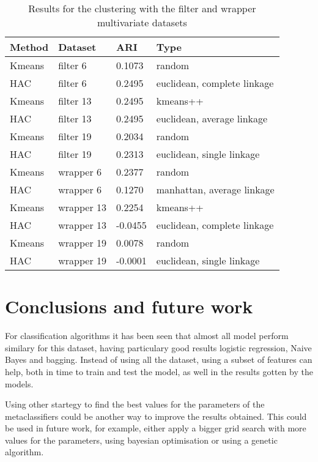 \documentclass[a4paper,11pt]{article}
\begin{document}
\begin{table}
\centering
\begin{tabular}{|l|l|l|l|}
\hline

\textbf{Method} & \textbf{Dataset} & \textbf{ARI} & \textbf{Type} \\ \hline
Kmeans & filter 6 & 0.1073 & random \\ \hline
HAC & filter 6 & 0.2495 & euclidean, complete linkage \\ \hline
Kmeans & filter 13 & 0.2495 & kmeans++ \\ \hline
HAC & filter 13 & 0.2495 & euclidean, average linkage \\ \hline
Kmeans & filter 19 & 0.2034 & random \\ \hline
HAC & filter 19 & 0.2313 & euclidean, single linkage \\ \hline
Kmeans & wrapper 6 & 0.2377 & random \\ \hline
HAC & wrapper 6 & 0.1270 & manhattan, average linkage \\ \hline
Kmeans & wrapper 13 & 0.2254 & kmeans++ \\ \hline
HAC & wrapper 13 & -0.0455 & euclidean, complete linkage \\ \hline
Kmeans & wrapper 19 & 0.0078 & random \\ \hline
HAC & wrapper 19 & -0.0001 & euclidean, single linkage \\ \hline

\end{tabular}
\caption{Results for the clustering with the filter and wrapper multivariate datasets}
\label{cl:mul}
\end{table}


\section{Conclusions and future work}

For classification algorithms it has been seen that almost all model perform similary for this dataset, having particulary good results logistic regression, Naive Bayes and bagging. Instead of using all the dataset, using a subset of features can help, both in time to train and test the model, as well in the results gotten by the models.

Using other startegy to find the best values for the parameters of the metaclassifiers could be another way to improve the results obtained. This could be used in future work, for example, either apply a bigger grid search with more values for the parameters, using bayesian optimisation or using a genetic algorithm.
\end{document}
